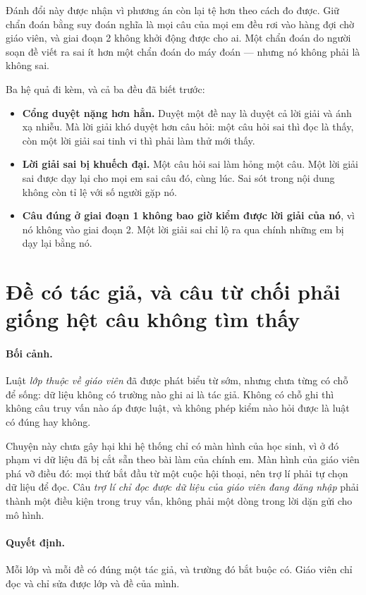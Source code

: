 Đánh đổi này được nhận vì phương án còn lại tệ hơn theo cách đo được. Giữ chẩn đoán bằng suy đoán
nghĩa là mọi câu của mọi em đều rơi vào hàng đợi chờ giáo viên, và giai đoạn 2 không khởi động
được cho ai. Một chẩn đoán do người soạn đề viết ra sai ít hơn một chẩn đoán do máy
đoán --- nhưng nó không phải là không sai.

Ba hệ quả đi kèm, và cả ba đều đã biết trước:

\begin{itemize}
  \item \textbf{Cổng duyệt nặng hơn hẳn.} Duyệt một đề nay là duyệt cả lời giải và ánh xạ nhiễu.
        Mà lời giải khó duyệt hơn câu hỏi: một câu hỏi sai thì đọc là thấy, còn một lời giải sai
        tinh vi thì phải làm thử mới thấy.
  \item \textbf{Lời giải sai bị khuếch đại.} Một câu hỏi sai làm hỏng một câu. Một lời giải sai
        được dạy lại cho mọi em sai câu đó, cùng lúc. Sai sót trong nội dung không còn tỉ lệ với
        số người gặp nó.
  \item \textbf{Câu đúng ở giai đoạn 1 không bao giờ kiểm được lời giải của nó}, vì nó không vào
        giai đoạn 2. Một lời giải sai chỉ lộ ra qua chính những em bị dạy lại bằng nó.
\end{itemize}

\section{Đề có tác giả, và câu từ chối phải giống hệt câu không tìm thấy}

\paragraph{Bối cảnh.} Luật \emph{lớp thuộc về giáo viên} đã được phát biểu từ sớm, nhưng chưa
từng có chỗ để sống: dữ liệu không có trường nào ghi ai là tác giả. Không có chỗ ghi thì không
câu truy vấn nào áp được luật, và không phép kiểm nào hỏi được là luật có đúng hay không.

Chuyện này chưa gây hại khi hệ thống chỉ có màn hình của học sinh, vì ở đó phạm vi dữ liệu đã bị
cắt sẵn theo bài làm của chính em. Màn hình của giáo viên phá vỡ điều đó: mọi thứ bắt đầu từ một
cuộc hội thoại, nên trợ lí phải tự chọn dữ liệu để đọc. Câu \emph{trợ lí chỉ đọc được dữ liệu của giáo viên đang đăng
nhập} phải thành một điều kiện trong truy vấn, không phải một dòng trong lời dặn gửi cho mô hình.

\paragraph{Quyết định.} Mỗi lớp và mỗi đề có đúng một tác giả, và trường đó bắt buộc có. Giáo
viên chỉ đọc và chỉ sửa được lớp và đề của mình.

